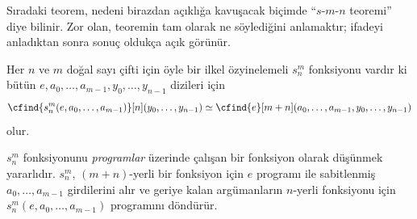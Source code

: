 


\begin{explain}
Sıradaki teorem, nedeni birazdan açıklığa kavuşacak biçimde
``$s$-$m$-$n$ teoremi'' diye bilinir. Zor olan, teoremin tam olarak ne
söylediğini anlamaktır; ifadeyi anladıktan sonra sonuç oldukça açık görünür.
\end{explain}

\begin{thm}
  Her $n$ ve $m$ doğal sayı çifti için öyle bir ilkel özyinelemeli
  $s^m_n$ fonksiyonu vardır ki bütün
  $e,a_0,\dots,a_{m-1},y_0,\dots,y_{n-1}$ dizileri için
  \[
    \cfind{s^m_n(e,a_0,\dots,a_{m-1})}[n](y_0,\dots,y_{n-1})\simeq
    \cfind{e}[m+n](a_0,\dots,a_{m-1},y_0,\dots,y_{n-1})
  \]
  olur.
\end{thm}

\begin{explain}
$s^m_n$ fonksiyonunu \emph{programlar} üzerinde çalışan bir fonksiyon olarak
düşünmek yararlıdır. $s^m_n$, $(m+n)$-yerli bir fonksiyon için $e$ programı
ile sabitlenmiş $a_0,\dots,a_{m-1}$ girdilerini alır ve geriye kalan
argümanların $n$-yerli fonksiyonu için
$s^m_n(e,a_0,\dots,a_{m-1})$ programını döndürür.
\end{explain}

